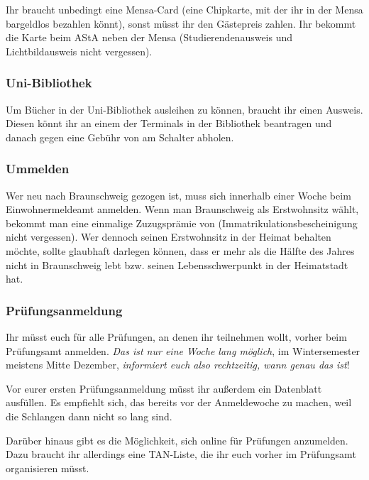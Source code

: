 Ihr braucht unbedingt eine Mensa-Card (eine Chipkarte,
mit der ihr in der Mensa bargeldlos bezahlen k\"onnt), sonst
m\"usst ihr den G\"astepreis zahlen. Ihr bekommt die Karte beim
AStA neben der Mensa (Studierendenausweis und Lichtbildausweis
nicht vergessen).

\subsubsection{Uni-Bibliothek}

Um B\"ucher in der Uni-Bibliothek ausleihen zu k\"onnen, braucht ihr
einen Ausweis. Diesen k\"onnt ihr an einem der Terminals in der
Bibliothek beantragen und danach gegen eine Geb\"uhr von \unit[5]{\EUR}{}
am Schalter abholen.

\subsubsection{Ummelden}

Wer neu nach Braunschweig gezogen ist, muss sich innerhalb einer
Woche beim Einwohnermeldeamt anmelden. Wenn man Braunschweig als
Erstwohnsitz w\"ahlt, bekommt man eine einmalige Zuzugspr\"amie von
\unit[200]{\EUR}{} (Immatrikulationsbescheinigung nicht vergessen). Wer
dennoch seinen Erstwohnsitz in der Heimat behalten m\"ochte, sollte
glaubhaft darlegen k\"onnen, dass er mehr als die H\"alfte des Jahres
nicht in Braunschweig lebt bzw. seinen Lebensschwerpunkt in der
Heimatstadt hat.

\subsubsection{Pr\"ufungsanmeldung}

Ihr m\"usst euch f\"ur alle Pr\"ufungen, an denen ihr teilnehmen
wollt, vorher beim Pr\"ufungsamt anmelden. \emph{Das ist nur eine
Woche lang m\"oglich}, im Wintersemester meistens Mitte Dezember,
\emph{informiert euch also rechtzeitig, wann genau das ist}!

Vor eurer ersten Pr\"ufungsanmeldung m\"usst ihr au\ss erdem ein
Datenblatt ausf\"ullen. Es empfiehlt sich, das bereits vor der
Anmeldewoche zu machen, weil die Schlangen dann nicht so lang sind.

Dar\"uber hinaus gibt es die M\"oglichkeit, sich online f\"ur
Pr\"ufungen anzumelden. Dazu braucht ihr allerdings eine TAN-Liste,
die ihr euch vorher im Pr\"ufungsamt organisieren m\"usst.

